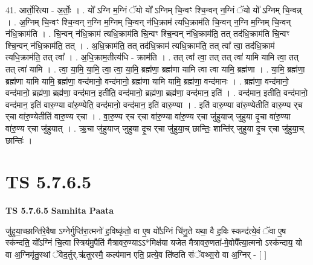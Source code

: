 \documentclass[17pt]{extarticle}
\begin{document}
41. आर्तो॒रित्या - अ॒र्तोः॒ । . यो᳚ ऽग्नि म॒ग्निं ॅयो यो᳚ ऽग्निम् चि॒न्वꣳ श्चि॒न्वन् न॒ग्निं ॅयो यो᳚ ऽग्निम् चि॒न्वन्न् । . अ॒ग्निम् चि॒न्वꣳ श्चि॒न्वन् न॒ग्नि म॒ग्निम् चि॒न्वन् न॑धि॒क्राम॑ त्यधि॒क्राम॑ति चि॒न्वन् न॒ग्नि म॒ग्निम् चि॒न्वन् न॑धि॒क्राम॑ति । . चि॒न्वन् न॑धि॒क्राम॑ त्यधि॒क्राम॑ति चि॒न्वꣳ श्चि॒न्वन् न॑धि॒क्राम॑ति॒ तत् तद॑धि॒क्राम॑ति चि॒न्वꣳ श्चि॒न्वन् न॑धि॒क्राम॑ति॒ तत् । . अ॒धि॒क्राम॑ति॒ तत् तद॑धि॒क्राम॑ त्यधि॒क्राम॑ति॒ तत् त्वा᳚ त्वा॒ तद॑धि॒क्राम॑ त्यधि॒क्राम॑ति॒ तत् त्वा᳚ । . अ॒धि॒क्राम॒तीत्य॑धि - क्राम॑ति । . तत् त्वा᳚ त्वा॒ तत् तत् त्वा॑ यामि यामि त्वा॒ तत् तत् त्वा॑ यामि । . त्वा॒ या॒मि॒ या॒मि॒ त्वा॒ त्वा॒ या॒मि॒ ब्रह्म॑णा॒ ब्रह्म॑णा यामि त्वा त्वा यामि॒ ब्रह्म॑णा । . या॒मि॒ ब्रह्म॑णा॒ ब्रह्म॑णा यामि यामि॒ ब्रह्म॑णा॒ वन्द॑मानो॒ वन्द॑मानो॒ ब्रह्म॑णा यामि यामि॒ ब्रह्म॑णा॒ वन्द॑मानः । . ब्रह्म॑णा॒ वन्द॑मानो॒ वन्द॑मानो॒ ब्रह्म॑णा॒ ब्रह्म॑णा॒ वन्द॑मान॒ इतीति॒ वन्द॑मानो॒ ब्रह्म॑णा॒ ब्रह्म॑णा॒ वन्द॑मान॒ इति॑ । . वन्द॑मान॒ इतीति॒ वन्द॑मानो॒ वन्द॑मान॒ इति॑ वारु॒ण्या वा॑रु॒ण्येति॒ वन्द॑मानो॒ वन्द॑मान॒ इति॑ वारु॒ण्या । . इति॑ वारु॒ण्या वा॑रु॒ण्येतीति॑ वारु॒ण्य र्‌च र्‌चा वा॑रु॒ण्येतीति॑ वारु॒ण्य र्‌चा । . वा॒रु॒ण्य र्‌च र्‌चा वा॑रु॒ण्या वा॑रु॒ण्य र्‌चा जु॑हुयाज् जुहुया दृ॒चा वा॑रु॒ण्या वा॑रु॒ण्य र्‌चा जु॑हुयात् । . ऋ॒चा जु॑हुयाज् जुहुया दृ॒च र्‌चा जु॑हुया॒च् छान्तिः॒ शान्ति॑र् जुहुया दृ॒च र्‌चा जु॑हुया॒च् छान्तिः॑ । \newline
\pagebreak
{}

\section{ TS 5.7.6.5 }

\textbf{TS 5.7.6.5 } \newline
\textbf{Samhita Paata} \newline

जु॑हुया॒च्छान्ति॑रे॒वैषा ऽग्नेर्गुप्ति॑रा॒त्मनो॑ ह॒विष्कृ॑तो॒ वा ए॒ष यो᳚ऽग्निं चि॑नु॒ते यथा॒ वै ह॒विः स्कन्द॑त्ये॒वं ॅवा ए॒ष स्क॑न्दति॒ यो᳚ऽग्निं चि॒त्वा स्त्रिय॑मु॒पैति॑ मैत्रावरु॒ण्याऽऽ*मिक्ष॑या यजेत मैत्रावरु॒णता॑-मे॒वोपै᳚त्या॒त्मनो ऽस्क॑न्दाय॒ यो वा अ॒ग्निमृ॑तु॒स्थां ॅवेद॒र्तुर्.ऋ॑तुरस्मै॒ कल्प॑मान एति॒ प्रत्ये॒व ति॑ष्ठति संॅवथ्स॒रो वा अ॒ग्निर् - [  ] \newline
\end{document}
